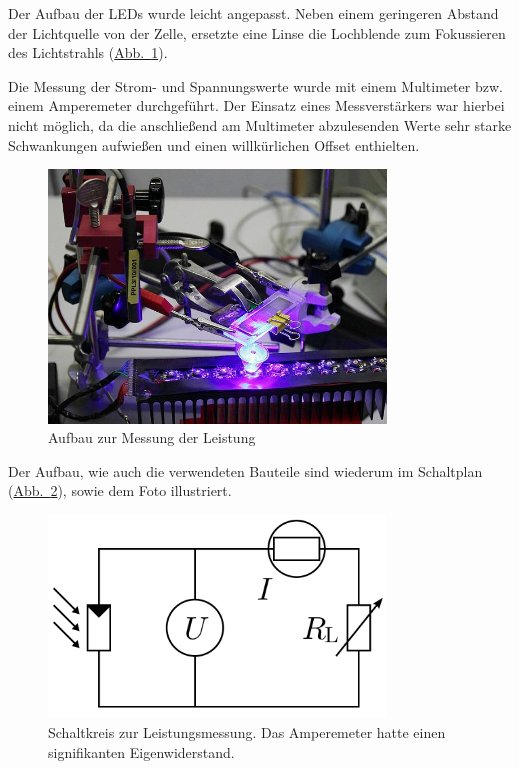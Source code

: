 \documentclass[11pt]{scrartcl}
\begin{document}
Der Aufbau der LEDs wurde leicht angepasst. Neben einem geringeren Abstand der Lichtquelle von der Zelle, ersetzte eine Linse die Lochblende zum Fokussieren des Lichtstrahls (\hyperref[messung_leistung]{Abb.~\ref{messung_leistung}}).

Die Messung der Strom- und Spannungswerte wurde mit einem Multimeter bzw. einem Amperemeter durchgef\"uhrt. Der Einsatz eines Messverst\"arkers war hierbei nicht m\"oglich, da die anschlie\ss{}end am Multimeter abzulesenden Werte sehr starke Schwankungen aufwie\ss{}en und einen willkürlichen Offset enthielten.

\begin{figure}[ht]
\begin{center}
\includegraphics[width=0.8\textwidth]{images/messung_leistung.jpg}
\end{center}
\vspace{-1.5\baselineskip}
\caption{Aufbau zur Messung der Leistung}
\label{messung_leistung}
\end{figure}

Der Aufbau, wie auch die verwendeten Bauteile sind wiederum im Schaltplan (\hyperref[leistungsschaltkreis]{Abb.~\ref{leistungsschaltkreis}}), sowie dem Foto illustriert.

\begin{figure}[ht]
\begin{center}
\includegraphics[width=0.8\textwidth]{images/schaltplan.pdf}
\end{center}
\vspace{-1.5\baselineskip}
\caption{Schaltkreis zur Leistungsmessung. Das Amperemeter hatte einen signifikanten Eigenwiderstand.}
\label{leistungsschaltkreis}
\end{figure}
\end{document}
